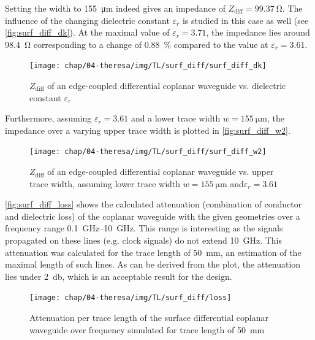 Setting the width to \SI{155}{\micro \meter} indeed gives an impedance of $Z_\text{diff} = \SI{99.37}{\ohm}$.
The influence of the changing dielectric constant $\varepsilon_r$ is studied in this case as well (see \autoref{fig:surf_diff_dk}). 
At the maximal value of $\varepsilon_r = 3.71$, the impedance lies around \SI{98.4}{\ohm} corresponding to a change of \SI{0.88}{\percent} compared to the value at $\varepsilon_r = 3.61$. 

\begin{figure}[tb]
	\centering
	\texttt{[image: chap/04-theresa/img/TL/surf\_diff/surf\_diff\_dk]}
	\caption[DCWG, $Z_\text{diff}$ vs. $\varepsilon_r$]{$Z_\text{diff}$ of an edge-coupled differential coplanar waveguide vs. dielectric constant $\varepsilon_r$}
	\label{fig:surf_diff_dk}
\end{figure}


Furthermore, assuming $\varepsilon_r = 3.61$ and a lower trace width $w = \SI{155}{\micro \meter}$, the impedance over a varying upper trace width is plotted in \autoref{fig:surf_diff_w2}.

\begin{figure}[tb]
	\centering
	\texttt{[image: chap/04-theresa/img/TL/surf\_diff/surf\_diff\_w2]}
	\caption[DCWG, $Z_\text{diff}$ vs. upper trace width]{$Z_\text{diff}$ of an edge-coupled differential coplanar waveguide vs. upper trace width, assuming lower trace width $w = \SI{155}{\micro \meter}$ and$\varepsilon_r = 3.61$}
	\label{fig:surf_diff_w2}
\end{figure}

\autoref{fig:surf_diff_loss} shows the calculated attenuation (combination of conductor and dielectric loss) of the coplanar waveguide with the given geometries over a frequency range \SIrange{0.1}{10}{\GHz}.
This range is interesting as the signals propagated on these lines (e.g. clock signals) do not extend \SI{10}{\GHz}.
This attenuation was calculated for the trace length of \SI{50}{\mm}, an estimation of the maximal length of such lines.
As can be derived from the plot, the attenuation lies under \SI{2}{\decibel}, which is an acceptable result for the design.

\begin{figure}[bhbh]
	\centering
	\texttt{[image: chap/04-theresa/img/TL/surf\_diff/loss]}
	\caption[Attenuation DCWG for \SI{200}{\mm}]{Attenuation per trace length of the surface differential coplanar waveguide over frequency simulated for trace length of \SI{50}{\mm}}
	\label{fig:surf_diff_loss}
\end{figure}

